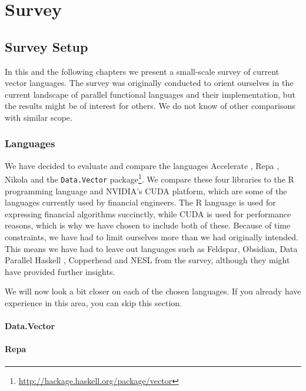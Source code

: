 \part{Survey}
\chapter{Survey Setup}
In this and the following chapters we present a small-scale survey of
current vector languages. The survey was originally conducted to
orient ourselves in the current landscape of parallel functional
languages and their implementation, but the results might be of
interest for others. We do not know of other comparisons with similar
scope.

\section{Languages}
We have decided to evaluate and compare the languages Accelerate
\cite{chakravarty2011accelerating}, Repa \cite{keller2010regular},
Nikola \cite{mainland2010nikola} and the \texttt{Data.Vector}
package\footnote{\url{http://hackage.haskell.org/package/vector}}. We
compare these four libraries to the R programming language and NVIDIA's
CUDA platform, which are some of the languages currently used by
financial engineers. The R language is used for expressing financial
algorithms succinctly, while CUDA is used for performance reasons,
which is why we have chosen to include both of these. Because of time
constraints, we have had to limit ourselves more than we had originally
intended. This means we have had to leave out languages such as
Feldspar\cite{axelsson2010feldspar},
Obsidian\cite{svensson2011obsidian}, Data Parallel Haskell \cite{},
Copperhead\cite{Catanzaro2011} and NESL\cite{nesl} from the survey,
although they might have provided further insights.


We will now look a bit closer on each of the chosen languages. If you
already have experience in this area, you can skip this section.

\subsection{Data.Vector}

\subsection{Repa}

